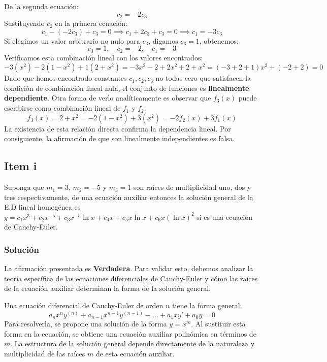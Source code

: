 \documentclass[a4paper]{article}
\begin{document}
De la segunda ecuación:
$$
c_2 = -2c_3
$$
Sustituyendo $c_2$ en la primera ecuación:
$$
c_1 - (-2c_3) + c_3 = 0 \implies c_1 + 2c_3 + c_3 = 0 \implies c_1 = -3c_3
$$
Si elegimos un valor arbitrario no nulo para $c_3$, digamos $c_3 = 1$, obtenemos:
$$
c_3 = 1, \quad c_2 = -2, \quad c_1 = -3
$$
Verificamos esta combinación lineal con los valores encontrados:
$$
-3(x^2) - 2(1 - x^2) + 1(2 + x^2) = -3x^2 - 2 + 2x^2 + 2 + x^2 = (-3 + 2 + 1)x^2 + (-2 + 2) = 0
$$
Dado que hemos encontrado constantes $c_1, c_2, c_3$ no todas cero que satisfacen la condición de combinación lineal nula, el conjunto de funciones es \textbf{linealmente dependiente}. Otra forma de verlo analíticamente es observar que $f_3(x)$ puede escribirse como combinación lineal de $f_1$ y $f_2$:
$$
f_3(x) = 2 + x^2 = -2(1 - x^2) + 3(x^2) = -2f_2(x) + 3f_1(x)
$$
La existencia de esta relación directa confirma la dependencia lineal. Por consiguiente, la afirmación de que son linealmente independientes es falsa.


\subsection{Item i}
Suponga que $m_1=3$, $m_2=-5$ y $m_3= 1$ son raíces de multiplicidad uno, dos y tres respectivamente, de una ecuación auxiliar entonces la solución general de la E.D lineal homogénea es $y= c_1 x^3 + c_2 x^{-5} + c_3 x^{-5} \ln x+ c_4 x+ c_5 x \ln x+ c_6 x(\ln x)^2$ si es una ecuación de Cauchy-Euler.

\subsubsection{Solución}
La afirmación presentada es \textbf{Verdadera}. Para validar esto, debemos analizar la teoría específica de las ecuaciones diferenciales de Cauchy-Euler y cómo las raíces de la ecuación auxiliar determinan la forma de la solución general.

Una ecuación diferencial de Cauchy-Euler de orden $n$ tiene la forma general:
$$
a_n x^n y^{(n)} + a_{n-1} x^{n-1} y^{(n-1)} + \dots + a_1 x y' + a_0 y = 0
$$
Para resolverla, se propone una solución de la forma $y = x^m$. Al sustituir esta forma en la ecuación, se obtiene una ecuación auxiliar polinómica en términos de $m$. La estructura de la solución general depende directamente de la naturaleza y multiplicidad de las raíces $m$ de esta ecuación auxiliar.
\end{document}
